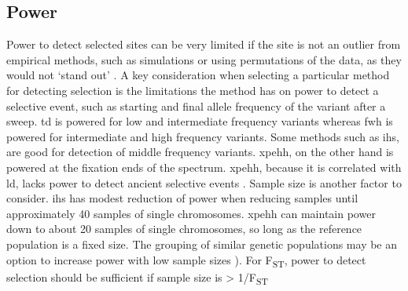\documentclass[twoside,openright]{report}
\begin{document}
\subsection{Power}\label{power}

Power to detect selected sites can be very limited if the site is not an
outlier from empirical methods, such as simulations or using
permutations of the data, as they would not `stand out'
\citep{Teshima2006}. A key consideration when selecting a particular
method for detecting selection is the limitations the method has on
power to detect a selective event, such as starting and final allele
frequency of the variant after a sweep. \Gls{td} is powered for low and
intermediate frequency variants \citep{Simonsen1995} whereas \gls{fwh}
is powered for intermediate and high frequency variants. Some methods
such as \gls{ihs}, are good for detection of middle frequency variants.
\Gls{xpehh}, on the other hand is powered at the fixation ends of the
spectrum. \Gls{xpehh}, because it is correlated with \gls{ld}, lacks
power to detect ancient selective events \citep{Chen2010}. Sample size
is another factor to consider. \Gls{ihs} has modest reduction of power
when reducing samples until approximately 40 samples of single
chromosomes. \Gls{xpehh} can maintain power down to about 20 samples of
single chromosomes, so long as the reference population is a fixed size.
The grouping of similar genetic populations may be an option to increase
power with low sample sizes \citep{pickrell2009signals}). For
F\textsubscript{ST}, power to detect selection should be sufficient if
sample size is \textgreater{} 1/F\textsubscript{ST}
\citep{Bhatia2011, Bhatia2013a}
\end{document}
